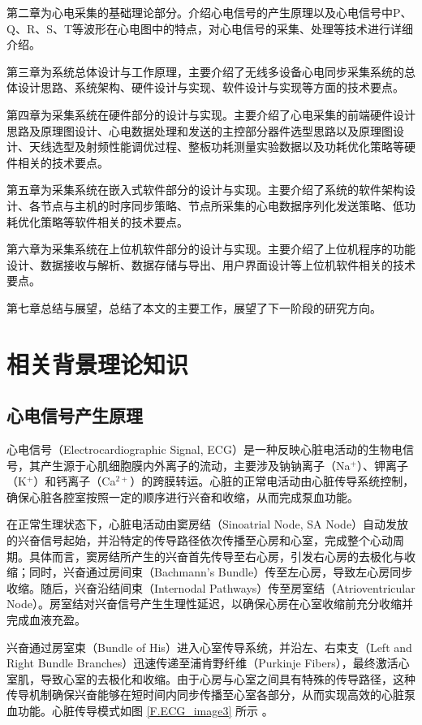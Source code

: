 第二章为心电采集的基础理论部分。介绍心电信号的产生原理以及心电信号中P、Q、R、S、T等波形在心电图中的特点，对心电信号的采集、处理等技术进行详细介绍。

第三章为系统总体设计与工作原理，主要介绍了无线多设备心电同步采集系统的总体设计思路、系统架构、硬件设计与实现、软件设计与实现等方面的技术要点。

第四章为采集系统在硬件部分的设计与实现。主要介绍了心电采集的前端硬件设计思路及原理图设计、心电数据处理和发送的主控部分器件选型思路以及原理图设计、天线选型及射频性能调优过程、整板功耗测量实验数据以及功耗优化策略等硬件相关的技术要点。

第五章为采集系统在嵌入式软件部分的设计与实现。主要介绍了系统的软件架构设计、各节点与主机的时序同步策略、节点所采集的心电数据序列化发送策略、低功耗优化策略等软件相关的技术要点。

第六章为采集系统在上位机软件部分的设计与实现。主要介绍了上位机程序的功能设计、数据接收与解析、数据存储与导出、用户界面设计等上位机软件相关的技术要点。

第七章总结与展望，总结了本文的主要工作，展望了下一阶段的研究方向。

\newpage    %

\section{相关背景理论知识}

\subsection{心电信号产生原理}

心电信号（Electrocardiographic Signal, ECG）是一种反映心脏电活动的生物电信号，其产生源于心肌细胞膜内外离子的流动，主要涉及钠钠离子（Na$^+$）、钾离子（K$^+$）和钙离子（Ca$^{2+}$）的跨膜转运。心脏的正常电活动由心脏传导系统控制，确保心脏各腔室按照一定的顺序进行兴奋和收缩，从而完成泵血功能。

在正常生理状态下，心脏电活动由窦房结（Sinoatrial Node, SA Node）自动发放的兴奋信号起始，并沿特定的传导路径依次传播至心房和心室，完成整个心动周期。具体而言，窦房结所产生的兴奋首先传导至右心房，引发右心房的去极化与收缩；同时，兴奋通过房间束（Bachmann’s Bundle）传至左心房，导致左心房同步收缩。随后，兴奋沿结间束（Internodal Pathways）传至房室结（Atrioventricular Node）。房室结对兴奋信号产生生理性延迟，以确保心房在心室收缩前充分收缩并完成血液充盈。

兴奋通过房室束（Bundle of His）进入心室传导系统，并沿左、右束支（Left and Right Bundle Branches）迅速传递至浦肯野纤维（Purkinje Fibers），最终激活心室肌，导致心室的去极化和收缩。由于心房与心室之间具有特殊的传导路径，这种传导机制确保兴奋能够在短时间内同步传播至心室各部分，从而实现高效的心脏泵血功能。心脏传导模式如图 \ref{F.ECG_image3} 所示 \cite{现代医学电子仪器原理与设计} 。

